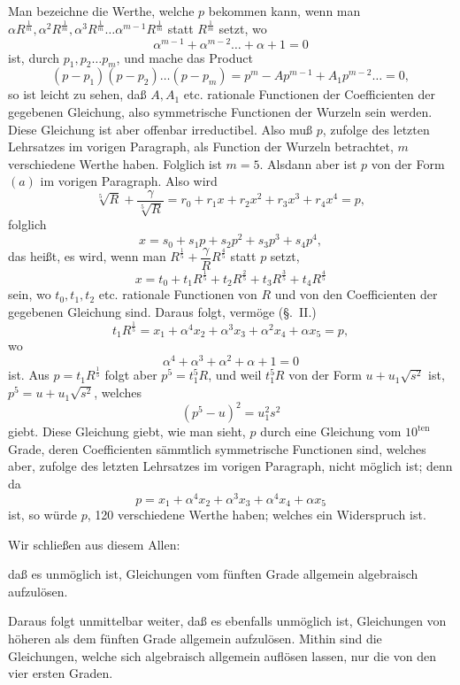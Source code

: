 \documentclass{article}
\begin{document}
Man bezeichne die Werthe, welche $p$ bekommen kann, wenn man $\alpha R^{\frac{1}{m}}, \alpha^{2} R^{\frac{1}{m}}, \alpha^{3} R^{\frac{1}{m}} \ldots \alpha^{m-1} R^{\frac{1}{m}}$ statt $R^{\frac{1}{m}}$ setzt, wo
\[ \alpha^{m-1} + \alpha^{m-2} \ldots + \alpha + 1 = 0 \]
ist, durch $p_1, p_2 \ldots p_m$, und mache das Product
\[ (p - p_1)(p - p_2) \ldots (p - p_m) = p^{m} - Ap^{m-1} + A_1 p^{m-2} \ldots = 0, \]
so ist leicht zu sehen, daß $A, A_1$ etc. rationale Functionen der Coefficienten der gegebenen Gleichung, also symmetrische Functionen der Wurzeln sein werden. Diese Gleichung ist aber offenbar irreductibel. Also muß $p$, zufolge des letzten Lehrsatzes im vorigen Paragraph, als Function der Wurzeln betrachtet, $m$ verschiedene Werthe haben. Folglich ist $m = 5$. Alsdann aber ist $p$ von der Form $(a)$ im vorigen Paragraph. Also wird
\[ \sqrt[5]{R} + \frac{\gamma}{\sqrt[5]{R}} = r_0 + r_1 x + r_2 x^{2} + r_3 x^{3} + r_4 x^{4} = p, \]
folglich
\[ x = s_0 + s_1 p + s_2 p^{2} + s_3 p^{3} + s_4 p^{4}, \]
das heißt, es wird, wenn man $R^{\frac{1}{5}} + \dfrac{\gamma}{R} R^{\frac{4}{5}}$ statt $p$ setzt,
\[ x = t_0 + t_1 R^{\frac{1}{5}} + t_2 R^{\frac{2}{5}} + t_3 R^{\frac{3}{5}} + t_4 R^{\frac{4}{5}} \]
sein, wo $t_0, t_1, t_2$ etc. rationale Functionen von $R$ und von den Coefficienten der gegebenen Gleichung sind. Daraus folgt, vermöge (§.~II.)
\[ t_1 R^{\frac{1}{5}} = x_1 + \alpha^{4} x_2 + \alpha^{3} x_3 + \alpha^{2} x_4 + \alpha x_5 = p, \]
wo
\[ \alpha^{4} + \alpha^{3} + \alpha^{2} + \alpha + 1 = 0 \]
ist. Aus $p = t_1 R^{\frac{1}{5}}$ folgt aber $p^{5} = t_1^{5} R$, und weil $t_1^{5} R$ von der Form $u + u_1 \sqrt{s^{2}}$ ist, $p^{5} = u + u_1 \sqrt{s^{2}}$, welches
\[ (p^{5} - u)^{2} = u_1^{2} s^{2} \]
giebt. Diese Gleichung giebt, wie man sieht, $p$ durch eine Gleichung vom $10^{\text{ten}}$ Grade, deren Coefficienten sämmtlich symmetrische Functionen sind, welches aber, zufolge des letzten Lehrsatzes im vorigen Paragraph, nicht möglich ist; denn da
\[ p = x_1 + \alpha^{4} x_2 + \alpha^{3} x_3 + \alpha^{4} x_4 + \alpha x_5 \]
ist, so würde $p$, 120 verschiedene Werthe haben; welches ein Widerspruch ist.

Wir schließen aus diesem Allen:

daß es unmöglich ist, Gleichungen vom fünften Grade allgemein algebraisch aufzulösen.

Daraus folgt unmittelbar weiter, daß es ebenfalls unmöglich ist, Gleichungen von höheren als dem fünften Grade allgemein aufzulösen. Mithin sind die Gleichungen, welche sich algebraisch allgemein auflösen lassen, nur die von den vier ersten Graden.
\end{document}

